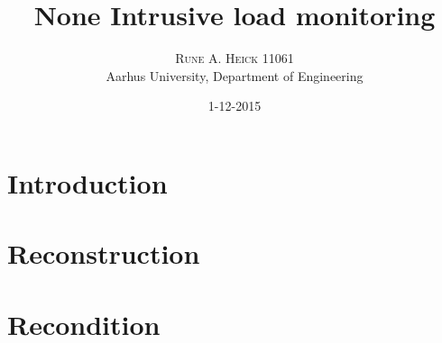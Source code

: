 


\title{\vspace{-15mm}\fontsize{24pt}{10pt}\selectfont\textbf{None Intrusive load monitoring}} %

\author{
\large
\textsc{Rune A. Heick 11061}\\[2mm] %
\normalsize Aarhus University, Department of Engineering \\ %
\vspace{-5mm}
}
\date{1-12-2015}


\setlength{\abovedisplayskip}{1cm}
\setlength{\belowdisplayskip}{.8cm}
\maketitle %

\newpage

\begin{abstract}
\lipsum[7] %
\end{abstract}

\newpage

\tableofcontents


\chapter{Introduction}
\lipsum[1] %
\newpage
\newpage

\chapter{Reconstruction}
\lipsum[3] %
\chapter{Recondition}
\lipsum[4] %
\begingroup
	\raggedright
	
\endgroup


